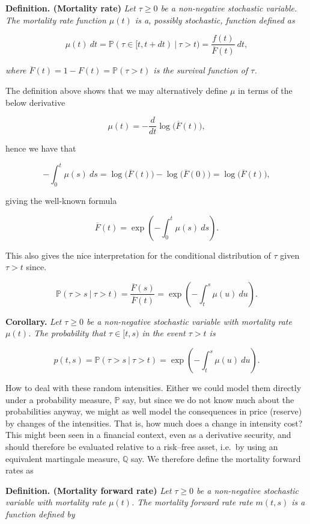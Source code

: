 \documentclass[a4paper,10pt,openany]{book}
\begin{document}
\textbf{Definition. (Mortality rate)} \emph{Let \(\tau\ge 0\) be a non-negative stochastic variable. The mortality rate function \(\mu(t)\) is a, possibly stochastic, function defined as}

\[
\mu(t)\ dt=\mathbb P(\tau\in[t,t+dt)\ \vert\ \tau > t)=\frac{f(t)}{\overline F(t)}\ dt,
\]

\emph{where \(\overline F(t)=1-F(t)=\mathbb P(\tau >t)\) is the survival function of \(\tau\).}

The definition above shows that we may alternatively define \(\mu\) in terms of the below derivative

\[
\mu(t)=-\frac{d}{dt}\log\Big(\overline F(t)\Big),
\]

hence we have that

\[
-\int_0^t\mu(s)\ ds=\log\Big(\overline F(t)\Big)-\log\Big(\overline F(0)\Big)=\log\Big(\overline F(t)\Big),
\]

giving the well-known formula

\[
\overline F(t)=\exp\left(-\int_0^t\mu(s)\ ds\right).
\]

This also gives the nice interpretation for the conditional distribution of \(\tau\) given \(\tau>t\) since.

\[
\mathbb P(\tau > s\ \vert\ \tau > t)=\frac{\overline F(s)}{\overline F(t)}=\exp\left(-\int_t^s\mu(u)\ du\right).
\]

\textbf{Corollary.} \emph{Let \(\tau\ge 0\) be a non-negative stochastic variable with mortality rate \(\mu(t)\). The probability that \(\tau \in [t,s)\) in the event \(\tau >t\) is}

\[
p(t,s)=\mathbb P(\tau > s\ \vert\ \tau > t)=\exp\left(-\int_t^s\mu(u)\ du\right).
\]

How to deal with these random intensities. Either we could model them directly under a probability measure, \(\mathbb P\) say, but since we do not know much about the probabilities anyway, we might as well model the consequences in price (reserve) by changes of the intensities. That is, how much does a change in intensity cost? This might been seen in a financial context, even as a derivative security, and should therefore be evaluated relative to a risk--free asset, i.e.~by using an equivalent martingale measure, \(\mathbb Q\) say. We therefore define the mortality forward rates as

\textbf{Definition. (Mortality forward rate)} \emph{Let \(\tau\ge 0\) be a non-negative stochastic variable with mortality rate \(\mu(t)\). The mortality forward rate rate \(m(t,s)\) is a function defined by}
\end{document}
